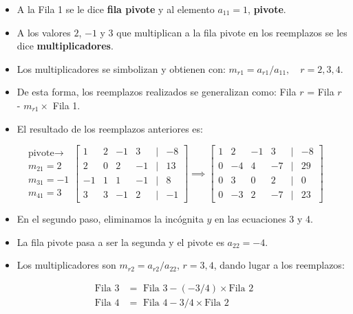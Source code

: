 \documentclass[openany]{book}
\providecommand{\tightlist}{%
  \setlength{\itemsep}{0pt}\setlength{\parskip}{0pt}}
\begin{document}
\begin{itemize}
\tightlist
\item
  A la Fila 1 se le dice \textbf{fila pivote} y al elemento \(a_{11}=1\), \textbf{pivote}.
\item
  A los valores \(2\), \(-1\) y \(3\) que multiplican a la fila pivote en los reemplazos se les dice \textbf{multiplicadores}.
\item
  Los multiplicadores se simbolizan y obtienen con: \(m_{r1} = a_{r1} / a_{11}, \quad r = 2, 3, 4\).
\item
  De esta forma, los reemplazos realizados se generalizan como: Fila \(r\) = Fila \(r\) - \(m_{r1}\times\) Fila 1.
\item
  El resultado de los reemplazos anteriores es:
\end{itemize}

\[
\begin{matrix}
\text{pivote} \rightarrow \\ m_{21} = 2 \\ m_{31} = -1 \\ m_{41} = 3
\end{matrix}
\begin{bmatrix}
1 & 2 & -1 & 3 &|& -8\\
2 & 0 & 2 & -1 &|& 13\\
-1 & 1 & 1 & -1 &|& 8\\
3 & 3 & -1 & 2 &|& -1  
\end{bmatrix}
\implies
\begin{bmatrix}
1 & 2 & -1 & 3 &|& -8\\
0 & -4 & 4 & -7 &|& 29\\
0 & 3 & 0 & 2 &|& 0\\
0 & -3 & 2 & -7 &|& 23  
\end{bmatrix}
\]

\begin{itemize}
\tightlist
\item
  En el segundo paso, eliminamos la incógnita \(y\) en las ecuaciones 3 y 4.
\item
  La fila pivote pasa a ser la segunda y el pivote es \(a_{22}=-4\).
\item
  Los multiplicadores son \(m_{r2}=a_{r2}/a_{22}\), \(r=3,4\), dando lugar a los reemplazos:
\end{itemize}

\[
\begin{array}{cl}
\text{Fila 3} &= \text{ Fila 3} - (-3/4) \times \text{Fila 2} \\
\text{Fila 4} &= \text{ Fila 4} - 3/4 \times \text{Fila 2} 
\end{array}
\]
\end{document}
